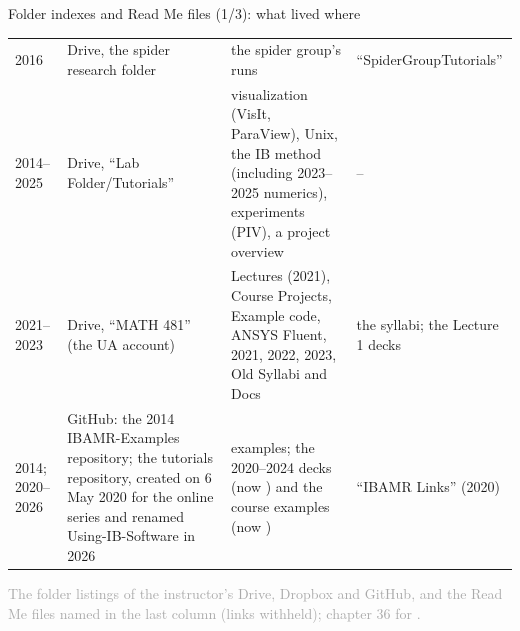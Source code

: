 \documentclass[aspectratio=169,11pt]{beamer}
\newcommand{\sourcecredit}[1]{\vfill\begin{flushright}\tiny\textcolor{DarkGray}{#1}\end{flushright}}
\begin{document}
\begin{frame}{Folder indexes and Read Me files (1/3): what lived where}
\begin{tabular}{@{}L{0.09\textwidth}L{0.2\textwidth}L{0.42\textwidth}L{0.23\textwidth}@{}}
2016 & Drive, the spider research folder & the spider group's runs & ``SpiderGroupTutorials'' \\
2014--2025 & Drive, ``Lab Folder/Tutorials'' & visualization (VisIt, ParaView), Unix, the IB method (including 2023--2025 numerics), experiments (PIV), a project overview & -- \\
2021--2023 & Drive, ``MATH 481'' (the UA account) & Lectures (2021), Course Projects, Example code, ANSYS Fluent, 2021, 2022, 2023, Old Syllabi and Docs & the syllabi; the Lecture 1 decks \\
2014; 2020--2026 & GitHub: the 2014 IBAMR-Examples repository; the tutorials repository, created on 6 May 2020 for the online series and renamed Using-IB-Software in 2026 & examples; the 2020--2024 decks (now ) and the course examples (now ) & ``IBAMR Links'' (2020) \\
\bottomrule
\end{tabular}
\sourcecredit{The folder listings of the instructor's Drive, Dropbox and GitHub, and the Read Me files named in the last column (links withheld); chapter 36 for \code{examples/legacy}.}
\end{frame}
\end{document}
